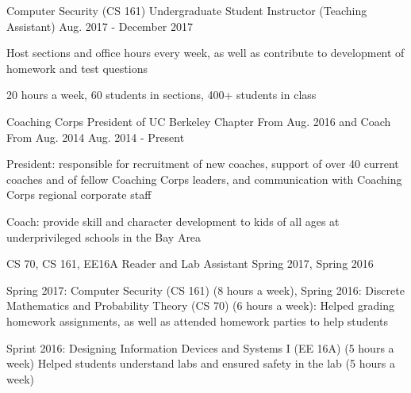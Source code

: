\vspace{-4mm}
\vspace{-2mm}


\begin{cventries}

  \cventry
    {Computer Security (CS 161)} %
    {Undergraduate Student Instructor (Teaching Assistant)} %
    {Aug. 2017 - December 2017} %
    {} %
    {
      \begin{cvitems} %
        \item {Host sections and office hours every week, as well as contribute to development of homework and test questions}
        \item {20 hours a week, 60 students in sections, 400+ students in class}
      \end{cvitems}
    }
 
  \cventry
    {Coaching Corps} %
    {President of UC Berkeley Chapter From Aug. 2016 and Coach From Aug. 2014} %
    {Aug. 2014 - Present} %
    {} %
    {
      \begin{cvitems} %
        \item {President: responsible for recruitment of new coaches, support of over 40 current coaches and of fellow Coaching Corps leaders, and communication with Coaching Corps regional corporate staff}
        \item {Coach: provide skill and character development to kids of all ages at underprivileged schools in the Bay Area}
      \end{cvitems}
    }
  \cventry
    {CS 70, CS 161, EE16A} %
    {Reader and Lab Assistant} %
    {Spring 2017, Spring 2016} %
    {} %
    {
      \begin{cvitems} %
        \item {Spring 2017: Computer Security (CS 161) (8 hours a week), Spring 2016: Discrete Mathematics and Probability Theory (CS 70) (6 hours a week): Helped grading homework assignments, as well as attended homework parties to help students}
         \item {Sprint 2016: Designing Information Devices and Systems I (EE 16A) (5 hours a week) Helped students understand labs and ensured safety in the lab (5 hours a week)}
      \end{cvitems}
    }


\end{cventries}
